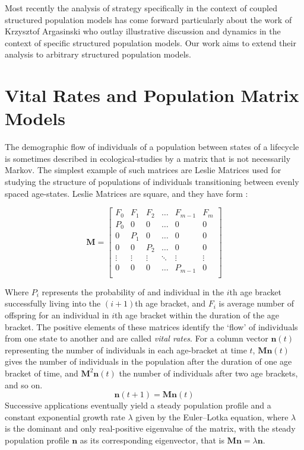Most recently the analysis of strategy specifically in the context of coupled structured population models has come forward particularly about the work of Krzysztof Argasinski \cite{Argasinski_Broom_2021,Argasinski_Rudnicki_2021,john2022age} who outlay illustrative discussion and dynamics in the context of specific structured population models.
Our work aims to extend their analysis to arbitrary structured population models.

\section{Vital Rates and Population Matrix Models}\label{sec:2}

The demographic flow of individuals of a population between states of a lifecycle is sometimes described in ecological-studies by a matrix that is not necessarily Markov.
The simplest example of such matrices are Leslie Matrices used for studying the structure of populations of individuals transitioning between evenly spaced age-states.
Leslie Matrices are square, and they have form \cite{leslie}:

\begin{equation*}
\mathbf{M}=\begin{bmatrix}
    F_0 & F_1 & F_2 & \dots & F_{m-1} & F_m  \\
    P_0 &  0  &  0  & \dots &  0      &  0   \\
     0  & P_1 &  0  & \dots &  0      &  0   \\
     0  &  0  & P_2 & \dots &  0      &  0   \\
    \vdots & \vdots & \vdots & \ddots & \vdots & \vdots \\
     0  &  0  &  0  & \dots  & P_{m-1} &  0   \\
\end{bmatrix}
\end{equation*}

Where $P_i$ represents the probability of and individual in the $i$th age bracket successfully living into the $(i+1)$th age bracket, and $F_i$ is average number of offspring for an individual in $i$th age bracket within the duration of the age bracket.
The positive elements of these matrices identify the `flow' of individuals from one state to another and are called \textit{vital rates}.
For a column vector $\mathbf{n}(t)$ representing the number of individuals in each age-bracket at time $t$, $\mathbf{M}\mathbf{n}(t)$ gives the number of individuals in the population after the duration of one age bracket of time, and $\mathbf{M}^2\mathbf{n}(t)$ the number of individuals after two age brackets, and so on. $$\mathbf{n}(t+1)=\mathbf{M}\mathbf{n}(t)$$
Successive applications eventually yield a steady population profile and a constant exponential growth rate $\lambda$ given by the Euler–Lotka equation, where $\lambda$ is the dominant and only real-positive eigenvalue of the matrix, with the steady population profile $\mathbf{n}$ as its corresponding eigenvector, that is $\mathbf{M}\mathbf{n}=\lambda \mathbf{n}$.

